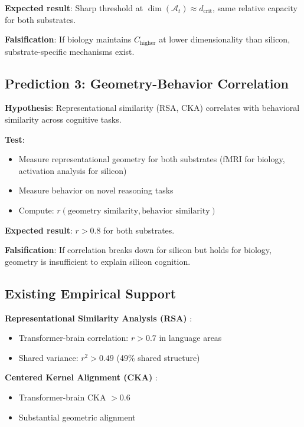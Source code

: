 \documentclass[11pt]{article}
\begin{document}
\textbf{Expected result}: Sharp threshold at $\dim(\mathcal{A}_t) \approx d_{\text{crit}}$, same relative capacity for both substrates.

\textbf{Falsification}: If biology maintains $C_{\text{higher}}$ at lower dimensionality than silicon, substrate-specific mechanisms exist.

\subsection{Prediction 3: Geometry-Behavior Correlation}

\textbf{Hypothesis}: Representational similarity (RSA, CKA) correlates with behavioral similarity across cognitive tasks.

\textbf{Test}:
\begin{itemize}
\item Measure representational geometry for both substrates (fMRI for biology, activation analysis for silicon)
\item Measure behavior on novel reasoning tasks
\item Compute: $r(\text{geometry similarity}, \text{behavior similarity})$
\end{itemize}

\textbf{Expected result}: $r > 0.8$ for both substrates.

\textbf{Falsification}: If correlation breaks down for silicon but holds for biology, geometry is insufficient to explain silicon cognition.

\subsection{Existing Empirical Support}

\textbf{Representational Similarity Analysis (RSA)} \citep{kriegeskorte2008representational}:
\begin{itemize}
\item Transformer-brain correlation: $r > 0.7$ in language areas
\item Shared variance: $r^2 > 0.49$ (49\% shared structure)
\end{itemize}

\textbf{Centered Kernel Alignment (CKA)} \citep{kornblith2019similarity}:
\begin{itemize}
\item Transformer-brain CKA $> 0.6$
\item Substantial geometric alignment
\end{itemize}
\end{document}
